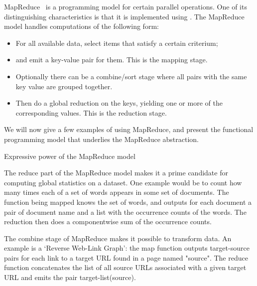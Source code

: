 
MapReduce~\cite{Google:mapreduce} is a programming model for certain
parallel operations. One of its distinguishing characteristics is that
it is implemented using .
The MapReduce model handles computations of the following form:
\begin{itemize}
\item For all available data, select items that satisfy a certain
  criterium;
\item and emit a key-value pair for them. This is the mapping stage.
\item Optionally there can be a combine/sort stage where all pairs with the
  same key value are grouped together.
\item Then do a global reduction on the keys, yielding one or more of
  the corresponding values. This is the reduction stage.
\end{itemize}

We will now give a few examples of using MapReduce, and present the
functional programming model that underlies the MapReduce abstraction.

 {Expressive power of the MapReduce model}
 
The reduce part of the MapReduce model makes it a prime candidate for
computing global statistics on a dataset.
One example would be to count how many times each of a set of words
appears in some set of documents. The function being mapped knows the
set of words, and outputs for each document a pair of document name
and a list with the occurrence counts of the words. The reduction then
does a componentwise sum of the occurrence counts.

The combine stage of MapReduce makes it possible to transform data.
An example is a `Reverse Web-Link Graph': the map function
outputs target-source pairs for each link to a target URL found in
a page named "source". The reduce function concatenates the list of
all source URLs associated with a given target URL and emits the pair
target-list(source).


